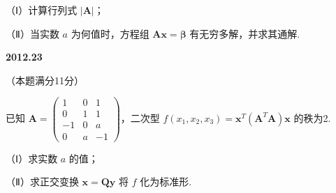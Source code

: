 \documentclass[UTF8,12pt,fontset=windows]{ctexart}
\begin{document}
（Ⅰ）计算行列式 $|\boldsymbol{A}|$；

（Ⅱ）当实数 $a$ 为何值时，方程组 $\boldsymbol{Ax} = \boldsymbol{\beta}$ 有无穷多解，并求其通解.

\vfill
\newpage
{\large\bfseries 2012.23}

（本题满分11分）

已知 $\boldsymbol{A} = \begin{pmatrix} 1 & 0 & 1 \\ 0 & 1 & 1 \\ -1 & 0 & a \\ 0 & a & -1 \end{pmatrix}$，二次型 $f(x_1, x_2, x_3) = \boldsymbol{x}^T(\boldsymbol{A}^T\boldsymbol{A})\boldsymbol{x}$ 的秩为2.

（Ⅰ）求实数 $a$ 的值；

（Ⅱ）求正交变换 $\boldsymbol{x} = \boldsymbol{Qy}$ 将 $f$ 化为标准形.

\vfill
\end{document}
